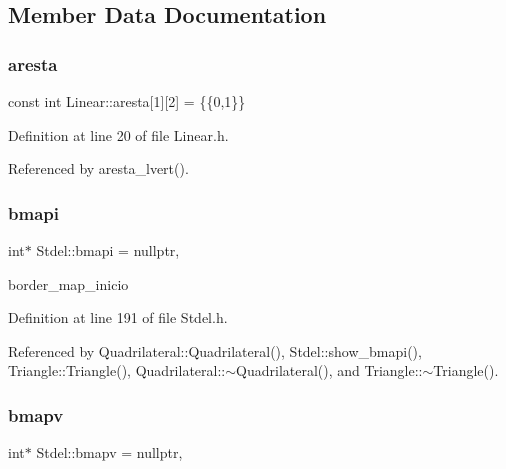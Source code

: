 \subsection{Member Data Documentation}
\mbox{\label{classLinear_a43f44fdc5222ab9b142aff780336b2b8}} 
\subsubsection{\texorpdfstring{aresta}{aresta}}
{\footnotesize\ttfamily const int Linear\+::aresta\mbox{[}1\mbox{]}\mbox{[}2\mbox{]} = \{\{0,1\}\}\hspace{0.3cm}{\ttfamily [private]}}



Definition at line 20 of file Linear.\+h.



Referenced by aresta\+\_\+lvert().

\mbox{\label{classStdel_a8b082d27e5c3cab7ad2045b464af0fd9}} 
\subsubsection{\texorpdfstring{bmapi}{bmapi}}
{\footnotesize\ttfamily int$\ast$ Stdel\+::bmapi = nullptr\hspace{0.3cm}{\ttfamily [protected]}, {\ttfamily [inherited]}}



border\+\_\+map\+\_\+inicio 



Definition at line 191 of file Stdel.\+h.



Referenced by Quadrilateral\+::\+Quadrilateral(), Stdel\+::show\+\_\+bmapi(), Triangle\+::\+Triangle(), Quadrilateral\+::$\sim$\+Quadrilateral(), and Triangle\+::$\sim$\+Triangle().

\mbox{\label{classStdel_ac3cd818c98aa400279f28c22c8e0abaa}} 
\subsubsection{\texorpdfstring{bmapv}{bmapv}}
{\footnotesize\ttfamily int$\ast$ Stdel\+::bmapv = nullptr\hspace{0.3cm}{\ttfamily [protected]}, {\ttfamily [inherited]}}



